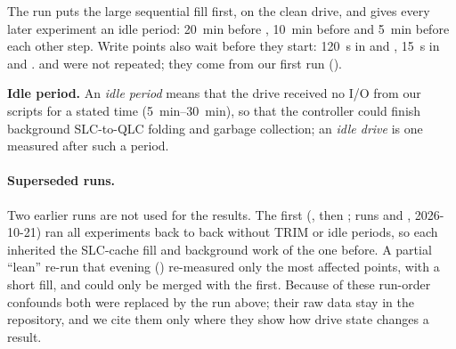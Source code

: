 The run puts the large sequential fill first, on the clean drive, and gives every later experiment an
idle period: \qty{20}{\minute} before , \qty{10}{\minute} before  and
\qty{5}{\minute} before each other step. Write points also wait before they start: \qty{120}{\second} in
 and , \qty{15}{\second} in  and .
 and  were not repeated; they come from our first run
().

\textbf{Idle period.} An \emph{idle period} means that the drive received no I/O from our scripts for a
stated time (\qtyrange{5}{30}{\minute}), so that the controller could finish background SLC-to-QLC folding
and garbage collection; an \emph{idle drive} is one measured after such a period.

\paragraph{Superseded runs.} Two earlier runs are not used for the results. The first
(, then ; runs  and
, 2026-10-21) ran all experiments back to back without TRIM or idle periods, so each
inherited the SLC-cache fill and background work of the one before. A partial \enquote{lean} re-run that
evening () re-measured only the most affected points, with a short fill, and could
only be merged with the first. Because of these run-order confounds both were replaced by the run above;
their raw data stay in the repository, and we cite them only where they show how drive state changes a
result.

